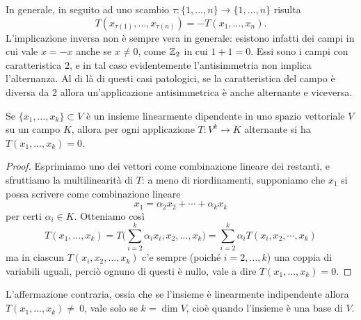 In generale, in seguito ad uno scambio $\tau\colon\{1,\dots,n\}\to\{1,\dots,n\}$ risulta
\begin{equation}
	T(x_{\tau(1)},\dots,x_{\tau(n)})=-T(x_1,\dots,x_n).
\end{equation}
L'implicazione inversa non è sempre vera in generale: esistono infatti dei campi in cui vale $x=-x$ anche se $x\ne 0$, come $\mathbb{Z}_2$ in cui $1+1=0$.
Essi sono i campi con caratteristica $2$, e in tal caso evidentemente l'antisimmetria non implica l'alternanza.
Al di là di questi casi patologici, se la caratteristica del campo è diversa da 2 allora un'applicazione antisimmetrica è anche alternante e viceversa.
\begin{proprieta} \label{pr:alternante-variabili-linearmente-dipendenti}
	Se $\{x_1,\dots,x_k\}\subset V$ è un insieme linearmente dipendente in uno spazio vettoriale $V$ su un campo $K$, allora per ogni applicazione $T\colon V^k\to K$ alternante si ha $T(x_1,\dots,x_k)=0$.
\end{proprieta}
\begin{proof}
	Esprimiamo uno dei vettori come combinazione lineare dei restanti, e sfruttiamo la multilinearità di $T$: a meno di riordinamenti, supponiamo che $x_1$ si possa scrivere come combinazione lineare
	\begin{equation}
		x_1=\alpha_2x_2+\cdots+\alpha_kx_k
	\end{equation}
	per certi $\alpha_i\in K$.
	Otteniamo cos\`i
	\begin{equation}
		T(x_1,\dots,x_k)=T\bigg(\sum_{i=2}^k\alpha_ix_i,x_2,\dots,x_k\bigg)=\sum_{i=2}^k\alpha_iT(x_i,x_2,\cdots,x_k)
	\end{equation}
	ma in ciascun $T(x_i,x_2,\dots,x_k)$ c'e sempre (poich\'e $i=2,\dots,k$) una coppia di variabili uguali, perciò ognuno di questi è nullo, vale a dire $T(x_1,\dots,x_k)=0$.
\end{proof}
L'affermazione contraria, ossia che se l'insieme è linearmente indipendente allora $T(x_1,\dots,x_k)\ne~0$, vale solo se $k=\dim V$, cioè quando l'insieme è una base di $V$.

